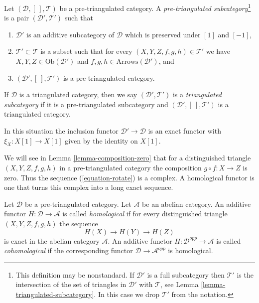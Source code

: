 \begin{definition}
\label{definition-triangulated-subcategory}
Let $(\mathcal{D}, [\ ], \mathcal{T})$ be a pre-triangulated category.
A {\it pre-triangulated subcategory}\footnote{This definition may be
nonstandard. If $\mathcal{D}'$ is a full subcategory then $\mathcal{T}'$
is the intersection of the set of triangles in $\mathcal{D}'$ with
$\mathcal{T}$, see
Lemma \ref{lemma-triangulated-subcategory}.
In this case we drop $\mathcal{T}'$ from the notation.}
is a pair $(\mathcal{D}', \mathcal{T}')$ such that
\begin{enumerate}
\item $\mathcal{D}'$ is an additive subcategory of $\mathcal{D}$
which is preserved under $[1]$ and $[-1]$,
\item $\mathcal{T}' \subset \mathcal{T}$ is a subset such that for every
$(X, Y, Z, f, g, h) \in \mathcal{T}'$ we have
$X, Y, Z \in \text{Ob}(\mathcal{D}')$ and
$f, g, h \in \text{Arrows}(\mathcal{D}')$, and
\item $(\mathcal{D}', [\ ], \mathcal{T}')$ is a pre-triangulated
category.
\end{enumerate}
If $\mathcal{D}$ is a triangulated category, then we say
$(\mathcal{D}', \mathcal{T}')$ is a {\it triangulated subcategory} if
it is a pre-triangulated subcategory and
$(\mathcal{D}', [\ ], \mathcal{T}')$ is a triangulated category.
\end{definition}

\noindent
In this situation the inclusion functor
$\mathcal{D}' \to \mathcal{D}$ is an exact functor
with $\xi_X : X[1] \to X[1]$ given by the identity on $X[1]$.

\medskip\noindent
We will see in
Lemma \ref{lemma-composition-zero}
that for a distinguished triangle $(X, Y, Z, f, g, h)$
in a pre-triangulated category the composition $g \circ f : X \to Z$ is zero.
Thus the sequence (\ref{equation-rotate}) is a complex.
A homological functor is one that turns this complex into a long
exact sequence.

\begin{definition}
\label{definition-homological}
Let $\mathcal{D}$ be a pre-triangulated category.
Let $\mathcal{A}$ be an abelian category.
An additive functor $H : \mathcal{D} \to \mathcal{A}$ is called
{\it homological} if for every distinguished triangle
$(X, Y, Z, f, g, h)$ the sequence
$$
H(X) \to H(Y) \to H(Z)
$$
is exact in the abelian category $\mathcal{A}$. An additive functor
$H : \mathcal{D}^{opp} \to \mathcal{A}$ is called {\it cohomological}
if the corresponding functor $\mathcal{D} \to \mathcal{A}^{opp}$ is
homological.
\end{definition}

